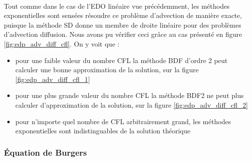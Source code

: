        \paragraph{}
        Tout comme dans le cas de l'EDO linéaire vue précédemment, les méthodes exponentielles sont sensées résoudre ce problème d'advection de manière exacte, puisque la méthode SD donne un membre de droite linéaire pour des problèmes d'advection diffusion. Nous avons pu vérifier ceci grâce au cas présenté en figure \ref{fig:edp_adv_diff_cfl}. On y voit que :
        \begin{itemize}
            \item pour une faible valeur du nombre CFL la méthode BDF d'ordre 2 peut calculer une bonne approximation de la solution, sur la figure \ref{fig:edp_adv_diff_cfl_1}
            \item pour une plus grande valeur du nombre CFL la méthode BDF2 ne peut plus calculer d'approximation de la solution, sur la figure \ref{fig:edp_adv_diff_cfl_2}
            \item pour n'importe quel nombre de CFL arbitrairement grand, les méthodes exponentielles sont indistinguables de la solution théorique
        \end{itemize}

    \subsubsection{Équation de Burgers}
